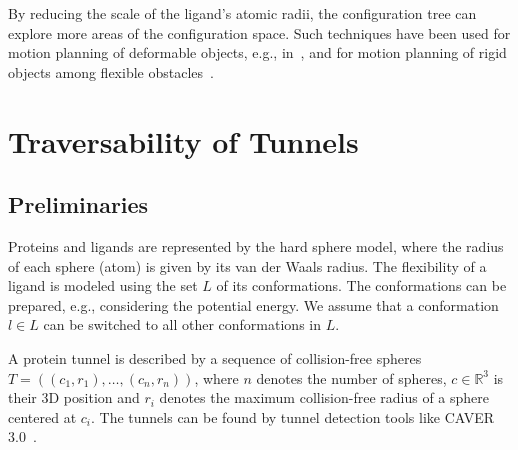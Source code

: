 \documentclass{svmult}
\def\R{\mathbb{R}}
\def\L{L}
\begin{document}
By reducing the scale of the ligand's atomic radii, the configuration tree can explore more areas of the configuration space.
Such techniques have been used for motion planning of deformable objects, 
e.g., in~\cite{frank2008efficient,bayazit2001ligand,alterovitz2008motion,lamiraux2001flexible,kavraki1998towards,gayle2005path}, 
and for motion planning of rigid objects among 
flexible obstacles~\cite{rodriguez2006planning,frank2008efficient,phillips2014representation}.


\section{Traversability of Tunnels}

\subsection{Preliminaries}

Proteins and ligands are represented by the hard sphere model, where the radius of each sphere (atom) is given by its van der Waals radius.
The flexibility of a ligand is modeled using the set $\L$ of its conformations.
The conformations can be prepared, e.g., considering the potential energy.
We assume that a conformation $l \in \L$ can be switched to all other conformations in $\L$.


A protein tunnel is described by a sequence of collision-free spheres 
$T=( (c_1, r_1),\ldots,(c_n,r_n) )$, where $n$ denotes the number of spheres,
$c \in \R^3$ is their 3D position and $r_i$ denotes the maximum collision-free radius of a sphere centered at $c_i$. 
The tunnels can be found by tunnel detection tools like CAVER 3.0~\cite{caver3}.

\end{document}

